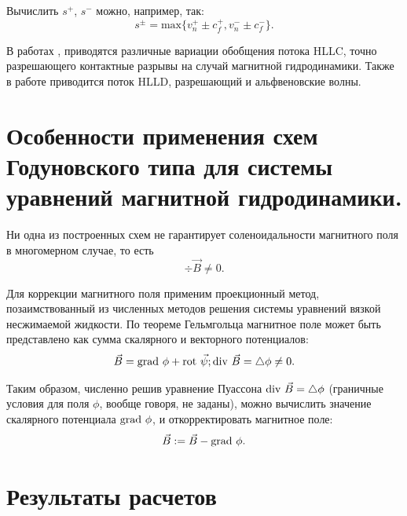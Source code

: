 \documentclass[14pt, a4paper, fleqn]{extreport}
\begin{document}
	Вычислить $s^{+}$, $s^{-}$ можно, например, так:
	\begin{equation*}
		s^{\pm} = \text{max}\big\lbrace v_n^{+} \pm c_f^{+}, v_n^{-} \pm c_f^{-} \big\rbrace.
	\end{equation*}
	
	В работах \cite{ShengtaiLi}, \cite{MIYOSHI2005315} 
	приводятся различные вариации обобщения потока HLLC, 
	точно разрешающего контактные разрывы на случай магнитной гидродинамики.
	Также в работе \cite{MIYOSHI2005315} приводится поток HLLD, разрешающий и альфвеновские волны.
	
		
	\section{Особенности применения схем Годуновского типа для системы уравнений 
			 магнитной гидродинамики.}
	
	Ни одна из построенных схем не гарантирует соленоидальности магнитного поля
	в многомерном случае, то есть
	\begin{equation*}
		\div{\vec{B}} \ne 0.
	\end{equation*}
	
	Для коррекции магнитного поля применим проекционный метод, 
	позаимствованный из численных методов решения системы уравнений вязкой 
	несжимаемой жидкости. 
	По теореме Гельмгольца магнитное поле может быть представлено как
	сумма скалярного и векторного потенциалов:
	\begin{equation*}
		\vec{B} = \text{grad }{\phi} + \text{rot }{\vec{\psi}}; 
		\text{div }{\vec{B}} = \mathop{}\!\mathbin\bigtriangleup{\phi} \ne 0.
	\end{equation*}
	
	Таким образом, численно решив уравнение Пуассона 
	$\text{div }{\vec{B}} = \mathop{}\!\mathbin\bigtriangleup{\phi}$ 
	(граничные условия для поля $\phi$, вообще говоря, не заданы), 
	можно вычислить значение скалярного потенциала $\text{grad }{\phi}$,
	и откорректировать магнитное поле:
	\begin{equation*}
		\vec{B} := \vec{B} - \text{grad }{\phi}.
	\end{equation*}
	
	\section{Результаты расчетов}
	
\end{document}

